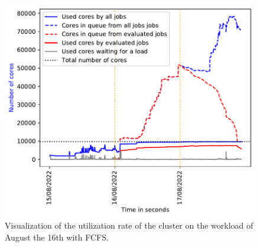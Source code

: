 \documentclass[conference,10pt]{IEEEtran}
\begin{document}
\begin{figure}[H]\centering\includegraphics[width=1\linewidth]{../MBSS/plot/Cluster_usage/2022-08-16->2022-08-16_V10000_Fcfs_Used_nodes_Reduced_450_128_32_256_4_1024_core_by_core.pdf}\caption{Visualization of the utilization rate of the cluster on the workload of August the 16th with FCFS.}\end{figure}
\end{document}
